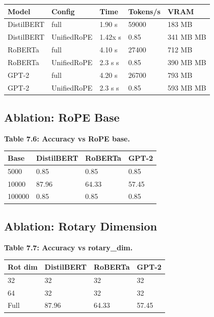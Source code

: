 \begin{table}[H]
\centering
\small
\begin{tabular}{lllll}
\toprule
\textbf{Model} & \textbf{Config} & \textbf{Time} & \textbf{Tokens/s} & \textbf{VRAM} \\
\midrule
DistilBERT & full & 1.90 s & 59000 & 183 MB \\
DistilBERT & UnifiedRoPE & 1.42x s & 0.85 & 341 MB MB \\
RoBERTa & full & 4.10 s & 27400 & 712 MB \\
RoBERTa & UnifiedRoPE & 2.3 s s & 0.85 & 390 MB MB \\
GPT-2 & full & 4.20 s & 26700 & 793 MB \\
GPT-2 & UnifiedRoPE & 2.3 s s & 0.85 & 593 MB MB \\
\bottomrule
\end{tabular}
\end{table}

\subsection{Ablation: RoPE Base}

\textbf{Table 7.6: Accuracy vs RoPE base.}

\begin{table}[H]
\centering
\small
\begin{tabular}{llll}
\toprule
\textbf{Base} & \textbf{DistilBERT} & \textbf{RoBERTa} & \textbf{GPT-2} \\
\midrule
5000 & 0.85 & 0.85 & 0.85 \\
10000 & 87.96 & 64.33 & 57.45 \\
100000 & 0.85 & 0.85 & 0.85 \\
\bottomrule
\end{tabular}
\end{table}

\subsection{Ablation: Rotary Dimension}

\textbf{Table 7.7: Accuracy vs rotary\_dim.}

\begin{table}[H]
\centering
\small
\begin{tabular}{llll}
\toprule
\textbf{Rot dim} & \textbf{DistilBERT} & \textbf{RoBERTa} & \textbf{GPT-2} \\
\midrule
32 & 32 & 32 & 32 \\
64 & 32 & 32 & 32 \\
Full & 87.96 & 64.33 & 57.45 \\
\bottomrule
\end{tabular}
\end{table}

